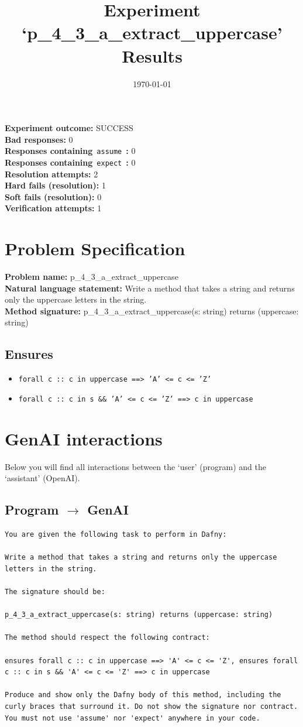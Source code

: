\documentclass{article}
\begin{document}
\title{Experiment `p\_4\_3\_a\_extract\_uppercase' Results}
\author{\today}
\date{}
\maketitle
\textbf{Experiment outcome: }SUCCESS
\\\textbf{Bad responses: }0
\\\textbf{Responses containing}~\texttt{assume}~\textbf{: }0
\\\textbf{Responses containing}~\texttt{expect}~\textbf{: }0
\\\textbf{Resolution attempts: }2
\\\textbf{Hard fails (resolution): }1
\\\textbf{Soft fails (resolution): }0
\\\textbf{Verification attempts: }1
\section*{Problem Specification}
\textbf{Problem name: }p\_4\_3\_a\_extract\_uppercase
\\\textbf{Natural language statement: }Write a method that takes a string and returns only the uppercase letters in the string.
\\\textbf{Method signature: }p\_4\_3\_a\_extract\_uppercase(s: string) returns (uppercase: string)
\subsection*{Ensures}
\begin{itemize}
\item \texttt{forall c :: c in uppercase ==> 'A' <= c <= 'Z'}
\item \texttt{forall c :: c in s \&\& 'A' <= c <= 'Z' ==> c in uppercase}
\end{itemize}
\clearpage
\section*{GenAI interactions}
Below you will find all interactions between the `user' (program) and the `assistant' (OpenAI).
\subsection*{Program $\rightarrow$ GenAI}
\begin{lstlisting}
You are given the following task to perform in Dafny:

Write a method that takes a string and returns only the uppercase letters in the string.

The signature should be:

p_4_3_a_extract_uppercase(s: string) returns (uppercase: string)

The method should respect the following contract:

ensures forall c :: c in uppercase ==> 'A' <= c <= 'Z', ensures forall c :: c in s && 'A' <= c <= 'Z' ==> c in uppercase

Produce and show only the Dafny body of this method, including the curly braces that surround it. Do not show the signature nor contract. You must not use 'assume' nor 'expect' anywhere in your code.
\end{lstlisting}
\end{document}
